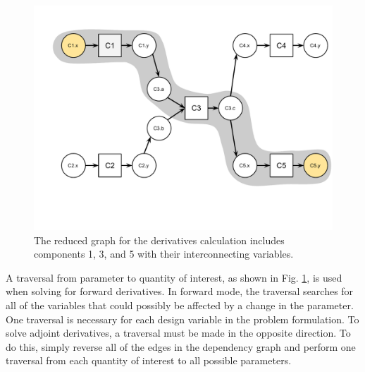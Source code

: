 \documentclass[]{aiaa-tc} %
\begin{document}
        \begin{figure}[!htb]\begin{center}
          \includegraphics[width=.8\textwidth]{images/relevant-path-graph}
          \caption{ The reduced graph for the derivatives calculation includes components 1, 3,
          and 5 with their interconnecting variables. \label{fig:graph2}}
        \end{center}\end{figure}

        A traversal from parameter to quantity of interest, as shown in Fig. \ref{fig:graph2}, is used when solving for 
        forward derivatives. In forward mode, the traversal searches for all of the variables that could possibly 
        be affected by a change in the parameter. One traversal is necessary for each design variable in the 
        problem formulation. To solve adjoint derivatives, a traversal must be made in 
        the opposite direction. To do this, simply reverse all of the edges in the dependency graph and 
        perform one traversal from each quantity of interest to all possible parameters. 
        
\end{document}
